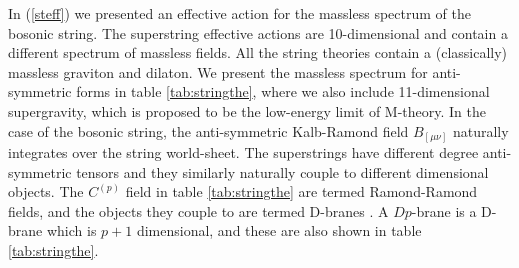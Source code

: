 \documentclass[11pt,a4paper]{article}
\numberwithin{equation}{section}
\numberwithin{table}{section}\setlength{\multlinegap}{25pt}
\begin{document}
In (\ref{steff}) we presented an effective action for the massless spectrum of the bosonic string. The superstring effective actions are 10-dimensional and contain a different spectrum of massless fields. All the string theories contain a (classically) massless graviton and dilaton. We present the massless spectrum for anti-symmetric forms in table \ref{tab:stringthe}, where we also include 11-dimensional supergravity, which is proposed to be the low-energy limit of M-theory. In the case of the bosonic string, the anti-symmetric Kalb-Ramond field $B_{[\mu\nu]}$ naturally integrates over the string world-sheet. The superstrings have different degree anti-symmetric tensors and they similarly naturally couple to different dimensional objects. The $C^{(p)}$ field in table \ref{tab:stringthe} are termed Ramond-Ramond fields, and the objects they couple to are termed D-branes \cite{Polchinski:1995mt}. A $Dp$-brane is a D-brane which is $p+1$ dimensional, and these are also shown in table \ref{tab:stringthe}. 
\end{document}

